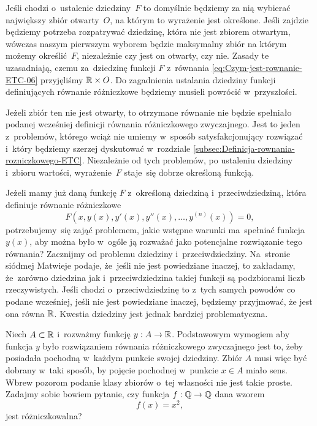 \documentclass[a4paper,11pt]{article}
\numberwithin{equation}{section}
\begin{document}
Jeśli chodzi o~ustalenie dziedziny~$F$ to domyślnie będziemy za
nią wybierać największy zbiór otwarty~$O$, na którym to wyrażenie jest
określone. Jeśli zajdzie będziemy potrzeba rozpatrywać dziedzinę, która
nie jest zbiorem otwartym, wówczas naszym pierwszym wyborem będzie
maksymalny zbiór na którym możemy określić~$F$, niezależnie czy jest on
otwarty, czy nie. Zasady te uzasadniają, czemu
za~dziedzinę funkcji $F$ z~równania \eqref{eq:Czym-jest-rownanie-ETC-06}
przyjęliśmy $\mathbb{R} \times O$. Do zagadnienia ustalania dziedziny funkcji
definiujących równanie różniczkowe będziemy musieli powrócić w~przyszłości.

Jeżeli zbiór ten nie jest otwarty, to otrzymane równanie
nie będzie spełniało podanej wcześniej definicji równania różniczkowego
zwyczajnego. Jest to jeden z~problemów, którego wciąż nie umiemy w~sposób
satysfakcjonujący rozwiązać i~który będziemy szerzej dyskutować w~rozdziale
\eqref{subsec:Definicja-rownania-rozniczkowego-ETC}. Niezależnie od tych
problemów, po ustaleniu dziedziny i~zbioru wartości, wyrażenie~$F$
staje~się dobrze określoną funkcją.

Jeżeli mamy już daną funkcję $F$ z~określoną dziedziną i~przeciwdziedziną,
która definiuje równanie różniczkowe
\begin{equation}
  \label{eq:Czym-jest-rownanie-ETC-07}
  F\left( x, y( x ), y'( x ), y''( x ), \ldots, y^{ ( n ) }( x ) \right) = 0,
\end{equation}
potrzebujemy~się zająć problemem, jakie wstępne warunki ma~spełniać funkcja
$y( x )$, aby można było w~ogóle ją rozważać jako potencjalne rozwiązanie
tego równania? Zacznijmy od problemu dziedziny i~przeciwdziedziny.
Na~stronie siódmej Matwieje podaje, że~jeśli nie jest powiedziane inaczej,
to zakładamy, że~zarówno dziedzina jak i~przeciwdziedzina takiej funkcji są
podzbiorami liczb rzeczywistych. Jeśli chodzi o~przeciwdziedzinę to z~tych
samych powodów co podane wcześniej, jeśli nie jest powiedziane inaczej,
będziemy przyjmować, że jest ona równa $\mathbb{R}$. Kwestia dziedziny jest
jednak bardziej problematyczna.

Niech $A \subset \mathbb{R}$ i~rozważmy funkcję $y : A \to \mathbb{R}$. Podstawowym wymogiem
aby funkcja $y$ było rozwiązaniem równania różniczkowego zwyczajnego jest
to, żeby posiadała pochodną w~każdym punkcie swojej dziedziny. Zbiór $A$
musi więc być dobrany w~taki sposób, by pojęcie pochodnej w~punkcie $x \in A$
miało sens. Wbrew pozorom podanie klasy zbiorów o~tej własności nie jest
takie proste. Zadajmy sobie bowiem pytanie, czy funkcja $f : \mathbb{Q} \to \mathbb{Q}$
dana wzorem
\begin{equation}
  \label{eq:Czym-jest-rownanie-ETC-08}
  f( x ) = x^{ 2 },
\end{equation}
jest różniczkowalna?
\end{document}
